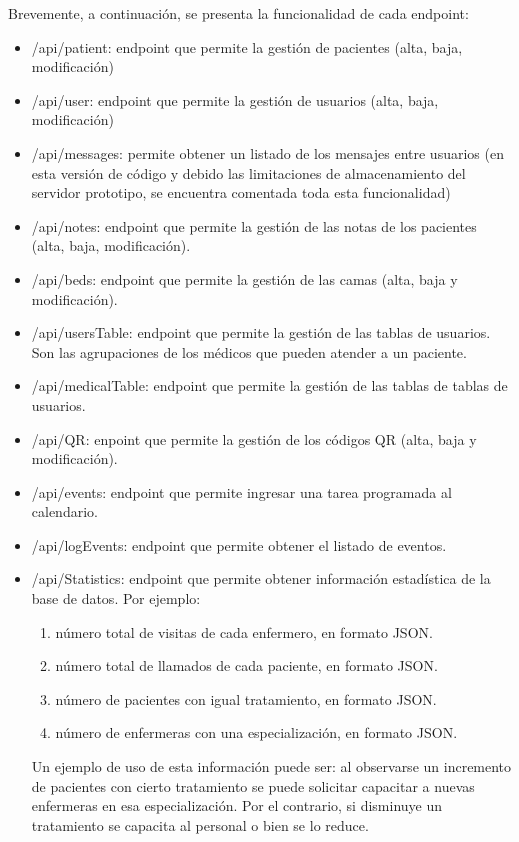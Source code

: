 Brevemente, a continuación, se presenta la funcionalidad de cada endpoint:
\begin{itemize}
\item /api/patient: endpoint que permite la gestión de pacientes (alta, baja, modificación)
\item /api/user: endpoint que permite la gestión de usuarios (alta, baja, modificación)
\item /api/messages: permite obtener un listado de los mensajes entre usuarios (en esta versión de código y debido las limitaciones de almacenamiento del servidor prototipo, se encuentra comentada toda esta funcionalidad)
\item /api/notes: endpoint que permite la gestión de las notas de los pacientes (alta, baja, modificación). 
\item /api/beds: endpoint que permite la gestión de las camas (alta, baja y modificación). 
\item /api/usersTable: endpoint que permite la gestión de las tablas de usuarios. Son las agrupaciones de los médicos que pueden atender a un paciente. 
\item /api/medicalTable: endpoint que permite la gestión de las tablas de tablas de usuarios.
\item /api/QR: enpoint que permite la gestión de los códigos QR (alta, baja y modificación).
\item /api/events: endpoint que permite ingresar una tarea programada al calendario.
\item /api/logEvents: endpoint que permite obtener el listado de eventos.
\item /api/Statistics: endpoint que permite obtener información estadística de la base de datos. Por ejemplo:
\begin{enumerate}
\item número total de visitas de cada enfermero, en formato JSON.
\item número total de llamados de cada paciente, en formato JSON.
\item número de pacientes con igual tratamiento, en formato JSON.
\item número de enfermeras con una especialización, en formato JSON.
\end{enumerate}

Un ejemplo de uso de esta información puede ser: al observarse un incremento de pacientes con cierto tratamiento se puede solicitar capacitar a nuevas enfermeras en esa especialización. Por el contrario, si disminuye un tratamiento se capacita al personal o bien se lo reduce.


\end{itemize}
